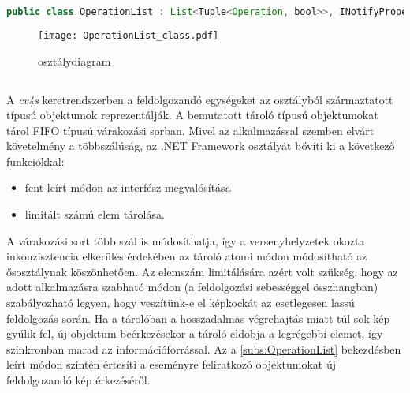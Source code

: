 \begin{mdframed}[backgroundcolor=gray!20]
\begin{small}
\begin{scriptsize}
\begin{lstlisting}[language=java]
public class OperationList : List<Tuple<Operation, bool>>, INotifyPropertyChanged
\end{lstlisting}
\end{scriptsize}
\end{small}
\end{mdframed}

\begin{figure}[h]
\texttt{[image: OperationList\_class.pdf]}
\centering
\caption{ osztálydiagram}
\label{fig:operation_list_class_diagram}
\end{figure}

\subsection{}
A \emph{cv4s} keretrendszerben a feldolgozandó egységeket az  osztályból származtatott típusú objektumok reprezentálják. A bemutatott tároló  típusú objektumokat tárol FIFO típusú várakozási sorban. Mivel az alkalmazással szemben elvárt követelmény a többszálúság, az  .NET Framework  osztályát bővíti ki a következő funkciókkal:
\begin{itemize}
\item fent leírt módon az  interfész megvalósítása
\item limitált számú elem tárolása.
\end{itemize}
A várakozási sort több szál is módosíthatja, így a versenyhelyzetek okozta inkonzisztencia elkerülés érdekében az tároló atomi módon módosítható az ősosztálynak köszönhetően. Az elemszám limitálására azért volt szükség, hogy az adott alkalmazásra szabható módon (a feldolgozási sebességgel összhangban) szabályozható legyen, hogy veszítünk-e el képkockát az esetlegesen lassú feldolgozás során. Ha a tárolóban a hosszadalmas végrehajtás miatt túl sok kép gyűlik fel, új objektum beérkezésekor a tároló eldobja a legrégebbi elemet, így szinkronban marad az információforrással. Az  a \ref{subs:OperationList} bekezdésben leírt módon szintén értesíti a  eseményre feliratkozó objektumokat új feldolgozandó kép érkezéséről.

